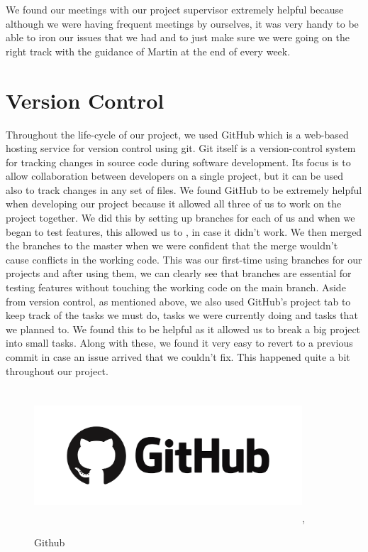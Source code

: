 \par
We found our meetings with our project supervisor extremely helpful because although we were having frequent meetings by ourselves, it was very handy to be able to iron our issues that we had and to just make sure we were going on the right track with the guidance of Martin at the end of every week.

\section{Version Control}
Throughout the life-cycle of our project, we used GitHub which is a web-based hosting service for version control using git. Git itself is a version-control system for tracking changes in source code during software development. Its focus is to allow collaboration between developers on a single project, but it can be used also to track changes in any set of files. We found GitHub to be extremely helpful when developing our project because it allowed all three of us to work on the project together. We did this by setting up branches for each of us and when we began to test features, this allowed us to , in case it didn’t work. We then merged the branches to the master when we were confident that the merge wouldn’t cause conflicts in the working code. This was our first-time using branches for our projects and after using them, we can clearly see that branches are essential for testing features without touching the working code on the main branch. Aside from version control, as mentioned above, we also used GitHub’s project tab to keep track of the tasks we must do, tasks we were currently doing and tasks that we planned to. We found this to be helpful as it allowed us to break a big project into small tasks. Along with these, we found it very easy to revert to a previous commit in case an issue arrived that we couldn’t fix. This happened quite a bit throughout our project.
\begin{figure}[ht]
\renewcommand\thefigure{3.2}
\centering
\includegraphics[width=10cm, height=5cm]{img/github.png},
\caption{Github}
\label{Github VC}
\end{figure}

